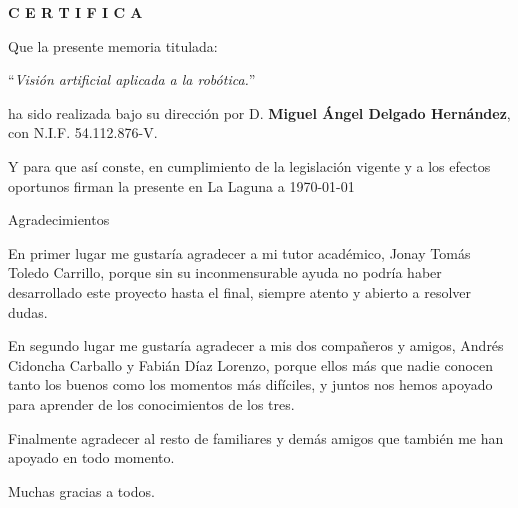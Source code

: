 \documentclass[spanish,a4paper,14pt,oneside]{extreport}
\begin{document}
\bigskip
\bigskip
{\bf C E R T I F I C A}

\bigskip
\bigskip
\bigskip
Que la presente memoria titulada:

\bigskip
``{\it Visión artificial aplicada a la robótica.}''

\bigskip
\bigskip
\bigskip

\noindent ha sido realizada bajo su dirección por D. {\bf Miguel Ángel Delgado Hernández},
con N.I.F. 54.112.876-V.

\bigskip
\bigskip

Y para que así conste, en cumplimiento de la legislación vigente y a los efectos
oportunos firman la presente en La Laguna a \today

\newpage
\thispagestyle{empty}

{ \flushright

\begin{LARGE}
Agradecimientos
\end{LARGE}

\hspace{3mm}

\begin{large}


\hspace{3mm}
En primer lugar me gustaría agradecer a mi tutor académico, Jonay Tomás Toledo
Carrillo, porque sin su inconmensurable ayuda no podría haber desarrollado este
proyecto hasta el final, siempre atento y abierto a resolver dudas.

\hspace{3mm}
En segundo lugar me gustaría agradecer a mis dos compañeros y amigos, Andrés
Cidoncha Carballo y Fabián Díaz Lorenzo, porque ellos más que nadie conocen
tanto los buenos como los momentos más difíciles, y juntos nos hemos apoyado
para aprender de los conocimientos de los tres.

\hspace{3mm}
Finalmente agradecer al resto de familiares y demás amigos que también me han
apoyado en todo momento. 

\hspace{3mm}
Muchas gracias a todos.


\end{large}

}

\newpage
\end{document}
